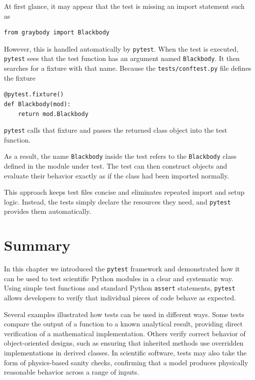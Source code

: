 At first glance, it may appear that the test is missing an import statement such as

\begin{verbatim}
from graybody import Blackbody
\end{verbatim}

However, this is handled automatically by \texttt{pytest}. When the test is executed, \texttt{pytest} sees that the test function has an argument named \texttt{Blackbody}. It then searches for a fixture with that name. Because the \texttt{tests/conftest.py} file defines the fixture

\begin{verbatim}
@pytest.fixture()
def Blackbody(mod):
    return mod.Blackbody
\end{verbatim}

\texttt{pytest} calls that fixture and passes the returned class object into the test function.

As a result, the name \texttt{Blackbody} inside the test refers to the \texttt{Blackbody} class defined in the module under test. The test can then construct objects and evaluate their behavior exactly as if the class had been imported normally.

This approach keeps test files concise and eliminates repeated import and setup logic. Instead, the tests simply declare the resources they need, and \texttt{pytest} provides them automatically.

\section{Summary}

In this chapter we introduced the \texttt{pytest} framework and demonstrated how it can be used to test scientific Python modules in a clear and systematic way.  Using simple test functions and standard Python \texttt{assert} statements, \texttt{pytest} allows developers to verify that individual pieces of code behave as expected.

Several examples illustrated how tests can be used in different ways.  Some tests compare the output of a function to a known analytical result, providing direct verification of a mathematical implementation.  Others verify correct behavior of object-oriented designs, such as ensuring that inherited methods use overridden implementations in derived classes.  In scientific software, tests may also take the form of physics-based sanity checks, confirming that a model produces physically reasonable behavior across a range of inputs.

